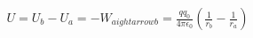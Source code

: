 \documentclass[preview]{standalone}
\begin{document}
\begin{align*}
U = U_b - U_a = - W_{a 
ightarrow b} = \frac{q q_0}{4 \pi \epsilon_0} \left( \frac{1}{r_b} - \frac{1}{r_a} \right)
\end{align*}
\end{document}
